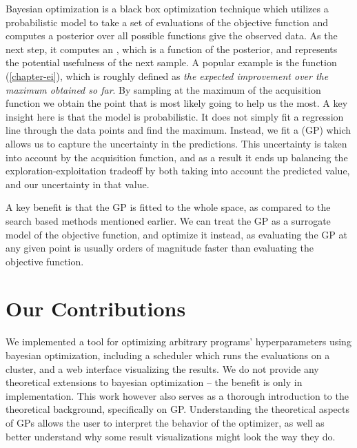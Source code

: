 Bayesian optimization \citep{nando-bayesian-out-of-the-loop} is a black box
optimization technique which utilizes a probabilistic model to take a set of
evaluations of the objective function and computes a posterior over all
possible functions give the observed data. As the next step, it computes an
, which is a function of the posterior, and
represents the potential usefulness of the next sample. A popular example is
the  function (\autoref{chapter-ei}), which is
roughly defined as \emph{the expected improvement over the maximum obtained so
far}. By sampling at the maximum of the acquisition function we obtain the
point that is most likely going to help us the most. A key insight here is that
the model is probabilistic. It does not simply fit a regression line through
the data points and find the maximum.  Instead, we fit a  (GP) which allows us to capture the uncertainty in the
predictions. This uncertainty is taken into account by the acquisition
function, and as a result it ends up balancing the exploration-exploitation
tradeoff by both taking into account the predicted value, and our uncertainty
in that value.

A key benefit is that the GP is fitted to the whole space, as compared to the search based methods mentioned earlier. We can treat the GP as a surrogate model of the objective function, and optimize it instead, as evaluating the GP at any given point is usually orders of magnitude faster than evaluating the objective function.






\section{Our Contributions}

We implemented a tool for optimizing arbitrary programs' hyperparameters using
bayesian optimization, including a scheduler which runs the evaluations on a
cluster, and a web interface visualizing the results. We do not provide any
theoretical extensions to bayesian optimization -- the benefit is only in
implementation. This work however also serves as a thorough introduction to the
theoretical background, specifically on GP. Understanding the theoretical
aspects of GPs allows the user to interpret the behavior of the optimizer, as
well as better understand why some result visualizations might look the way
they do.

